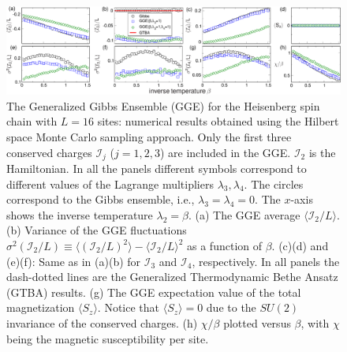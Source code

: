 \documentclass[twocolumn,superscriptaddress,prb,10pt]{revtex4-1}
\begin{document}
\begin{figure}[t]
\includegraphics*[width=0.93\linewidth]{./draft_figs/fig1}
\caption{The Generalized Gibbs Ensemble (GGE) for the Heisenberg spin chain with 
 $L=16$ sites: numerical results obtained using the Hilbert space Monte 
 Carlo sampling approach. Only the first three conserved charges ${\mathcal I}_j$ 
 ($j=1,2,3$) are included in the GGE. ${\mathcal I}_2$ is the Hamiltonian. In all 
 the panels different symbols correspond to different  values of the Lagrange multipliers 
 $\lambda_3,\lambda_4$. The circles correspond to the Gibbs ensemble, i.e., 
 $\lambda_3=\lambda_4=0$. The $x$-axis shows the inverse temperature  $\lambda_2=\beta$. 
 (a) The GGE average $\langle {\mathcal I}_2/L\rangle$. (b) Variance 
 of the GGE fluctuations $\sigma^2({\mathcal I}_2/L)\equiv \langle ({\mathcal I}_2/L)^2
 \rangle-\langle {\mathcal I}_2/L\rangle^2$ as a function of $\beta$. (c)(d) and (e)(f): 
 Same as in (a)(b) for ${\mathcal I}_3$ and ${\mathcal I}_4$, respectively. In all panels 
 the dash-dotted lines  are the Generalized Thermodynamic Bethe Ansatz (GTBA) results. 
 (g) The GGE expectation value of the total magnetization 
 $\langle S_z\rangle$. Notice that $\langle S_z\rangle=0$ due to the $SU(2)$ 
 invariance of the conserved charges. (h) $\chi/\beta$ plotted versus $\beta$, with 
 $\chi$ being the magnetic susceptibility per site. 
}
\label{fig1}
\end{figure}
\end{document}
